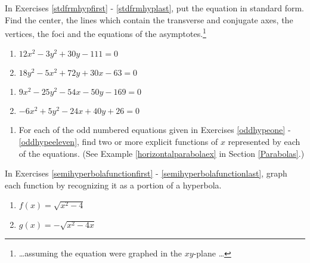 \documentclass{ximera}
\begin{document}
In Exercises \ref{stdfrmhypfirst} - \ref{stdfrmhyplast}, put the equation in standard form.  Find the center, the lines which contain the transverse and conjugate axes, the vertices, the foci and the equations of the asymptotes.\footnote{ \ldots assuming the equation were graphed in the $xy$-plane \ldots}

\begin{multicols}{2}
\begin{enumerate}
\setcounter{enumi}{\value{HW}}

\item $12x^{2} - 3y^{2} + 30y - 111 = 0$  \label{stdfrmhypfirst}  \label{oddhypenine}
\item $18y^{2} - 5x^{2} +  72y + 30x - 63= 0$

\setcounter{HW}{\value{enumi}}
\end{enumerate}
\end{multicols}

\begin{multicols}{2}
\begin{enumerate}
\setcounter{enumi}{\value{HW}}
 
\item $9x^2-25y^2-54x-50y-169 = 0$  \label{oddhypeeleven}
\item $-6x^2+5y^2-24x+40y+26=0$  \label{stdfrmhyplast}

\setcounter{HW}{\value{enumi}}
\end{enumerate}
\end{multicols}

\begin{enumerate}
\setcounter{enumi}{\value{HW}}

\item For each of the odd numbered equations given in Exercises \ref{oddhypeone} - \ref{oddhypeeleven}, find two or more explicit functions of $x$ represented by each of the equations.  (See Example \ref{horizontalparabolaex} in Section \ref{Parabolas}.)

\setcounter{HW}{\value{enumi}}
\end{enumerate}

In Exercises \ref{semihyperbolafunctionfirst} - \ref{semihyperbolafunctionlast}, graph each function by recognizing it as a portion of a hyperbola.

\begin{multicols}{2}
\begin{enumerate}
\setcounter{enumi}{\value{HW}}

\item   $f(x) = \sqrt{x^2-4}$ \label{semihyperbolafunctionfirst}
\item   $g(x) = -\sqrt{x^2-4x}$

\setcounter{HW}{\value{enumi}}
\end{enumerate}
\end{multicols}
\end{document}

